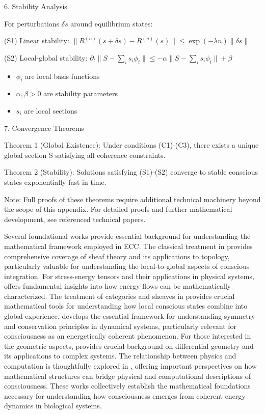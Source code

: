 \begin{refsection}
6. Stability Analysis

For perturbations $\delta s$ around equilibrium states:

(S1) Linear stability:
$\|R^{(n)}(s + \delta s) - R^{(n)}(s)\| \leq \exp(-\lambda n)\|\delta s\|$

(S2) Local-global stability:
$\partial_t\|S - \sum_i s_i\phi_i\| \leq -\alpha\|S - \sum_i s_i\phi_i\| + \beta$

\begin{itemize}
\item $\phi_i$ are local basis functions
\item $\alpha,\beta > 0$ are stability parameters
\item $s_i$ are local sections
\end{itemize}

7. Convergence Theorems

Theorem 1 (Global Existence): Under conditions (C1)-(C3), there exists a unique global section S satisfying all coherence constraints.

Theorem 2 (Stability): Solutions satisfying (S1)-(S2) converge to stable conscious states exponentially fast in time.

Note: Full proofs of these theorems require additional technical machinery beyond the scope of this appendix. For detailed proofs and further mathematical development, see referenced technical papers.

Several foundational works provide essential background for understanding the mathematical framework employed in ECC. The classical treatment in \cite{bredon1997sheaf} provides comprehensive coverage of sheaf theory and its applications to topology, particularly valuable for understanding the local-to-global aspects of conscious integration. For stress-energy tensors and their applications in physical systems, \cite{misner2017gravitation} offers fundamental insights into how energy flows can be mathematically characterized. The treatment of categories and sheaves in \cite{kashiwara2006categories} provides crucial mathematical tools for understanding how local conscious states combine into global experience. \cite{marsden2013introduction} develops the essential framework for understanding symmetry and conservation principles in dynamical systems, particularly relevant for consciousness as an energetically coherent phenomenon. For those interested in the geometric aspects, \cite{wells2008differential} provides crucial background on differential geometry and its applications to complex systems. The relationship between physics and computation is thoughtfully explored in \cite{baez2011physics}, offering important perspectives on how mathematical structures can bridge physical and computational descriptions of consciousness. These works collectively establish the mathematical foundations necessary for understanding how consciousness emerges from coherent energy dynamics in biological systems.


\end{refsection}
